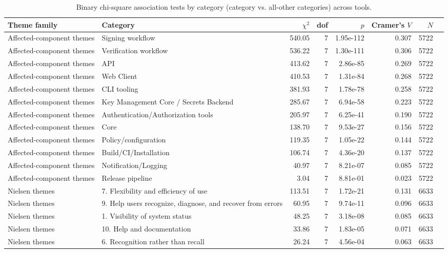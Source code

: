 \begin{table}[t]
\centering
\caption{Binary chi-square association tests by category (category vs. all-other categories) across tools.}
\label{tab:rq-binary-chi-all-categories}
\scriptsize
\begin{tabular}{llrrrrrr}
\hline
Theme family & Category & $\chi^2$ & dof & $p$ & Cramer's $V$ & $N$ \\
\hline
Affected-component themes & Signing workflow & 540.05 & 7 & 1.95e-112 & 0.307 & 5722 \\
Affected-component themes & Verification workflow & 536.22 & 7 & 1.30e-111 & 0.306 & 5722 \\
Affected-component themes & API & 413.62 & 7 & 2.86e-85 & 0.269 & 5722 \\
Affected-component themes & Web Client & 410.53 & 7 & 1.31e-84 & 0.268 & 5722 \\
Affected-component themes & CLI tooling & 381.93 & 7 & 1.78e-78 & 0.258 & 5722 \\
Affected-component themes & Key Management Core / Secrets Backend & 285.67 & 7 & 6.94e-58 & 0.223 & 5722 \\
Affected-component themes & Authentication/Authorization tools & 205.97 & 7 & 6.25e-41 & 0.190 & 5722 \\
Affected-component themes & Core & 138.70 & 7 & 9.53e-27 & 0.156 & 5722 \\
Affected-component themes & Policy/configuration & 119.35 & 7 & 1.05e-22 & 0.144 & 5722 \\
Affected-component themes & Build/CI/Installation & 106.74 & 7 & 4.36e-20 & 0.137 & 5722 \\
Affected-component themes & Notification/Logging & 40.97 & 7 & 8.21e-07 & 0.085 & 5722 \\
Affected-component themes & Release pipeline & 3.04 & 7 & 8.81e-01 & 0.023 & 5722 \\
Nielsen themes & 7. Flexibility and efficiency of use & 113.51 & 7 & 1.72e-21 & 0.131 & 6633 \\
Nielsen themes & 9. Help users recognize, diagnose, and recover from errors & 60.95 & 7 & 9.74e-11 & 0.096 & 6633 \\
Nielsen themes & 1. Visibility of system status & 48.25 & 7 & 3.18e-08 & 0.085 & 6633 \\
Nielsen themes & 10. Help and documentation & 33.86 & 7 & 1.83e-05 & 0.071 & 6633 \\
Nielsen themes & 6. Recognition rather than recall & 26.24 & 7 & 4.56e-04 & 0.063 & 6633 \\

\end{tabular}
\end{table}
